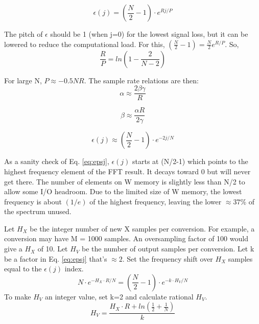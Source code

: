 \begin{equation} \label{eq:eps_j}
\epsilon(j) = \left(\frac{N}{2}-1\right)\cdot e^{Rj/P}
\end{equation}

The pitch of $\epsilon$ should be 1 (when j=0) for the lowest signal loss,
but it can be lowered to reduce the computational load.
For this, $(\frac{N}{2}-1) = \frac{N}{2} e^{R/P}$. So,
\begin{equation} \label{eq:p}
\frac{R}{P} = ln\left(1 - \frac{2}{N-2}\right)
\end{equation}

For large N, $P \approx -0.5 NR$. The sample rate relations are then:
\begin{equation}
\alpha \approx \frac{2\beta\gamma}{R}
\end{equation}

\begin{equation}
\beta \approx \frac{\alpha R}{2\gamma}
\end{equation}

\begin{equation}  \label{eq:epsj}
\epsilon(j) \approx \left(\frac{N}{2}-1\right)\cdot e^{-2j/N}
\end{equation}

As a sanity check of Eq. \ref{eq:epsj}, $\epsilon(j)$ starts at (N/2-1) which
points to the highest frequency element of the FFT result.
It decays toward 0 but will never get there.
The number of elements on W memory is slightly less than N/2 to allow some I/O
headroom. Due to the limited size of W memory,
the lowest frequency is about $(1/e)$ of the highest frequency,
leaving the lower $\approx37$\% of the spectrum unused.

Let $H_X$ be the integer number of new X samples per conversion.
For example, a conversion may have M = 1000 samples.
An oversampling factor of 100 would give a $H_X$ of 10.
Let $H_V$ be the number of output samples per conversion.
Let k be a factor in Eq. \ref{eq:epsj} that's $\approx 2$.
Set the frequency shift over $H_X$ samples equal to the $\epsilon(j)$ index.
\begin{equation}
N\cdot e^{-H_X\cdot R/N} = \left(\frac{N}{2}-1\right)\cdot e^{-k \cdot H_V/N}
\end{equation}
To make $H_V$ an integer value, set k=2 and calculate rational $H_V$.
\begin{equation}
H_V = \frac{H_X \cdot R + ln\left(\frac{1}{2} + \frac{1}{N}\right)}{k}
\end{equation}


